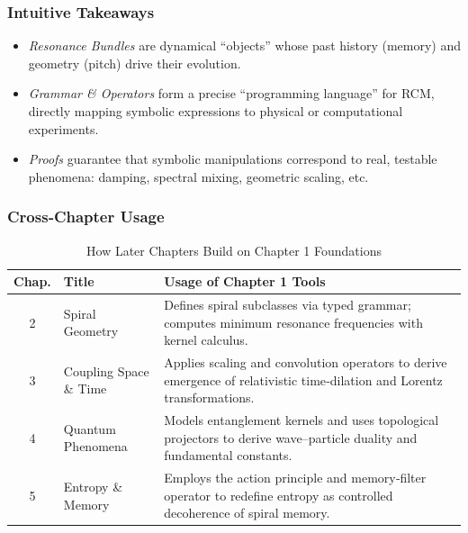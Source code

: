 \subsubsection{Intuitive Takeaways}
\begin{itemize}
  \item \emph{Resonance Bundles} are dynamical “objects” whose past history (memory) and geometry (pitch) drive their evolution.
  \item \emph{Grammar \& Operators} form a precise “programming language” for RCM, directly mapping symbolic expressions to physical or computational experiments.
  \item \emph{Proofs} guarantee that symbolic manipulations correspond to real, testable phenomena: damping, spectral mixing, geometric scaling, etc.
\end{itemize}

\newpage

\subsubsection{Cross‐Chapter Usage}
\begin{table}[ht]
  \centering
  \caption{How Later Chapters Build on Chapter 1 Foundations}
  \label{tab:cross-chapter}
  \begin{tabular}{@{}clp{8cm}@{}}
    \toprule
    \textbf{Chap.} & \textbf{Title}                          & \textbf{Usage of Chapter 1 Tools} \\
    \midrule
    2              & Spiral Geometry                         & Defines spiral subclasses via typed grammar; computes minimum resonance frequencies with kernel calculus. \\
    3              & Coupling Space \& Time                  & Applies scaling and convolution operators to derive emergence of relativistic time‐dilation and Lorentz transformations. \\
    4              & Quantum Phenomena                       & Models entanglement kernels and uses topological projectors to derive wave–particle duality and fundamental constants. \\
    5              & Entropy \& Memory                       & Employs the action principle and memory‐filter operator to redefine entropy as controlled decoherence of spiral memory. \\
    \bottomrule
  \end{tabular}
\end{table}

